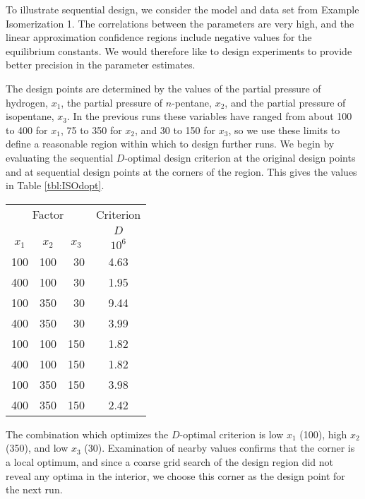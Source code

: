 \begin{example}\label{iso:dopt}
To illustrate sequential design, we consider the model and data set
from Example Isomerization 1.
The correlations between the parameters are very high, and the linear
approximation confidence regions include negative values for the
equilibrium constants.
We would therefore like to design experiments to provide better
precision in the parameter estimates.

The design points are determined by the values of the partial pressure
of hydrogen, $x_{1}$, the partial pressure of $n$-pentane, $x_{2}$,
and the partial pressure of isopentane, $x_{3}$.
In the previous runs these variables have ranged from about
100 to 400 for $x_{1}$, 75 to 350 for $x_{2}$, and 30 to
150 for $x_{3}$, so we use these limits to define a reasonable
region within which to design further runs.
We begin by evaluating the sequential
$D$-optimal design criterion at the original design points and at
sequential design points at the corners of the region.
This gives the values in Table \ref{tbl:ISOdopt}.
  \begin{table}
\begin{center}
\begin{tabular}{llrc}\hline
 \multicolumn{3}{c}{Factor}  & \multicolumn{1}{c}{Criterion}\\
& & & \multicolumn{1}{c}{$D$}\\
\multicolumn{1}{c}{$x_{1}$} & \multicolumn{1}{c}{$x_{2}$} & \multicolumn{1}{c}{$x_{3}$} & \multicolumn{1}{c}{$10^{6}$} \\ \hline
100&100&30&4.63\\
400&100&30&1.95\\
100&350&30&9.44\\
400&350&30&3.99\\
100&100&150&1.82\\
400&100&150&1.82\\
100&350&150&3.98\\
400&350&150&2.42\\ \hline
\end{tabular}
\end{center}
  \end{table}
The combination which optimizes the $D$-optimal criterion is low
$x_{1}$ (100), high $x_{2}$ (350), and low $x_{3}$ (30).
Examination of nearby values confirms that the
corner is a local optimum, and since a coarse grid search of the
design region did not reveal any optima in the interior,
we choose this corner as the design point for the next run.
\end{example}

